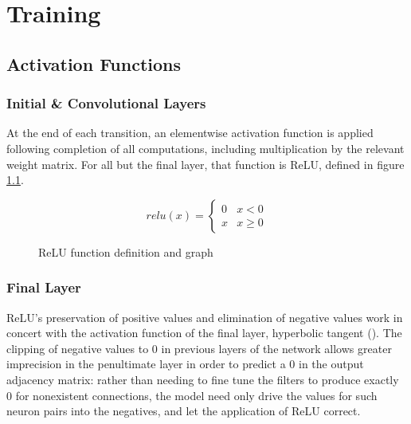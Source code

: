 \chapter{Training}


\section{Activation Functions}
\label{sec:activation}
\subsection{Initial \& Convolutional Layers}
At the end of each transition, an elementwise activation function is applied 
following completion of all computations, including multiplication by the 
relevant weight matrix.  For all but the final layer, that function is 
ReLU\cite{nair2010rectified}, defined in figure \ref{fig:relu}.

\begin{figure}[h]
	\centering
	\begin{minipage}{.48\textwidth}
		\begin{equation*}
			relu(x) = \begin{cases}
				0 & x < 0\\
				x & x \geq 0
			\end{cases}
		\end{equation*}
	\end{minipage}
	\begin{minipage}{.48\textwidth}
	\end{minipage}
	\caption{ReLU function definition and graph}
	\label{fig:relu}
\end{figure}\noindent


\subsection{Final Layer}
\label{subsec:finalactivation}
ReLU's preservation of positive values and elimination of negative values work 
in concert with the activation function of the final layer, hyperbolic tangent 
().
The clipping of negative values to 0 in previous layers of the network allows 
greater imprecision in the penultimate layer in order to predict a 0 in the 
output adjacency matrix: rather than needing to fine tune the filters to produce 
exactly 0 for nonexistent connections, the model need only drive the values for 
such neuron pairs into the negatives, and let the application of ReLU correct.  

